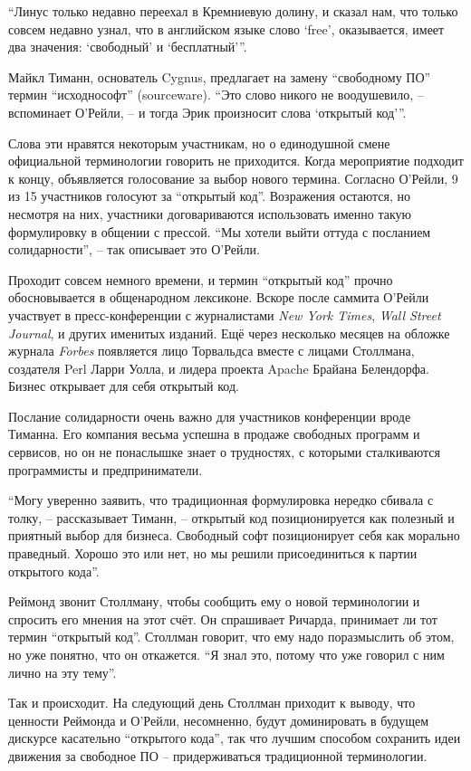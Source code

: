 ``Линус только недавно переехал в Кремниевую долину, и сказал нам, что только совсем недавно узнал, что в английском языке слово `free', оказывается, имеет два значения: `свободный' и `бесплатный'''.

Майкл Тиманн, основатель Cygnus, предлагает на замену ``свободному ПО'' термин ``исходнософт'' (sourceware). ``Это слово никого не воодушевило, -- вспоминает О'Рейли, -- и тогда Эрик произносит слова `открытый код'\hspace{0.01in}''.

Слова эти нравятся некоторым участникам, но о единодушной смене официальной терминологии говорить не приходится. Когда мероприятие подходит к концу, объявляется голосование за выбор нового термина. Согласно О'Рейли, 9 из 15 участников голосуют за ``открытый код''. Возражения остаются, но несмотря на них, участники договариваются использовать именно такую формулировку в общении с прессой. ``Мы хотели выйти оттуда с посланием солидарности'', -- так описывает это О'Рейли.

Проходит совсем немного времени, и термин ``открытый код'' прочно обосновывается в общенародном лексиконе. Вскоре после саммита О'Рейли участвует в пресс-конференции с журналистами \textit{New York Times}, \textit{Wall Street Journal}, и других именитых изданий. Ещё через несколько месяцев на обложке журнала \textit{Forbes} появляется лицо Торвальдса вместе с лицами Столлмана, создателя Perl Ларри Уолла, и лидера проекта Apache Брайана Белендорфа. Бизнес открывает для себя открытый код.

Послание солидарности очень важно для участников конференции вроде Тиманна. Его компания весьма успешна в продаже свободных программ и сервисов, но он не понаслышке знает о трудностях, с которыми сталкиваются программисты и предприниматели.

``Могу уверенно заявить, что традиционная формулировка нередко сбивала с толку, -- рассказывает Тиманн, -- открытый код позиционируется как полезный и приятный выбор для бизнеса. Свободный софт позиционирует себя как морально праведный. Хорошо это или нет, но мы решили присоединиться к партии открытого кода''.

Реймонд звонит Столлману, чтобы сообщить ему о новой терминологии и спросить его мнения на этот счёт. Он спрашивает Ричарда, принимает ли тот термин ``открытый код''. Столлман говорит, что ему надо поразмыслить об этом, но уже понятно, что он откажется. ``Я знал это, потому что уже говорил с ним лично на эту тему''.

Так и происходит. На следующий день Столлман приходит к выводу, что ценности Реймонда и О'Рейли, несомненно, будут доминировать в будущем дискурсе касательно ``открытого кода'', так что лучшим способом сохранить идеи движения за свободное ПО -- придерживаться традиционной терминологии.

